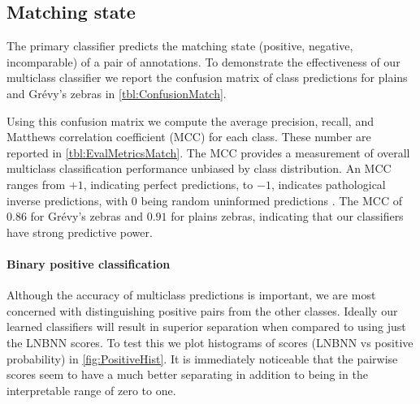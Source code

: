     \subsection{Matching state}

        The primary classifier predicts the matching state (positive, negative, incomparable) of a pair of
        annotations. To demonstrate the effectiveness of our multiclass classifier we report the confusion matrix
        of class predictions for plains and Grévy's zebras in \cref{tbl:ConfusionMatch}.

        \ConfusionMatch{}

        \EvalMetricsMatch{}

        Using this confusion matrix we compute the average precision, recall, and Matthews correlation
          coefficient (MCC) for each class.
        These number are reported in \cref{tbl:EvalMetricsMatch}.
        The MCC provides a measurement of overall multiclass classification performance unbiased by class
          distribution.
        An MCC ranges from $+1$, indicating perfect predictions, to $-1$, indicates pathological inverse
          predictions, with $0$ being random uninformed predictions \cite{powers_evaluation_2011}.
        The MCC of $0.86$ for Grévy's zebras and $0.91$ for plains zebras, indicating that our classifiers have
          strong predictive power.
        

        \paragraph{Binary positive classification}
        Although the accuracy of multiclass predictions is important, we are most concerned with distinguishing
          positive pairs from the other classes.
        Ideally our learned classifiers will result in superior separation when compared to using just the LNBNN
          scores.
        To test this we plot histograms of scores (LNBNN vs positive probability) in \cref{fig:PositiveHist}.
        It is immediately noticeable that the pairwise scores seem to have a much better separating in addition
          to being in the interpretable range of zero to one.


        \PositiveHist{}

